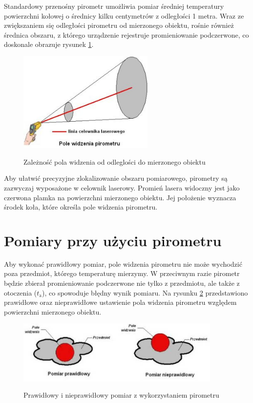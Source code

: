 Standardowy przenośny pirometr umożliwia pomiar średniej temperatury powierzchni kołowej o średnicy kilku centymetrów z odległości 1 metra. Wraz ze zwiększaniem się odległości pirometru od mierzonego obiektu, rośnie również średnica obszaru, z którego urządzenie rejestruje promieniowanie podczerwone, co doskonale obrazuje rysunek \ref{fig:pole}.

\begin{figure}[h!]
    \centering
    \includegraphics[width=0.6\textwidth]{images/pole.jpg}
    \caption{Zależność pola widzenia od odleglości do mierzonego obiektu} \cite{2}
    \label{fig:pole}
\end{figure}

\vspace{12pt}

Aby ułatwić precyzyjne zlokalizowanie obszaru pomiarowego, pirometry są zazwyczaj wyposażone w celownik laserowy. Promień lasera widoczny jest jako czerwona plamka na powierzchni mierzonego obiektu. Jej położenie wyznacza środek koła, które określa pole widzenia pirometru.

\section*{Pomiary przy użyciu pirometru}

Aby wykonać prawidłowy pomiar, pole widzenia pirometru nie może wychodzić poza przedmiot, którego temperaturę mierzymy. W przeciwnym razie pirometr będzie zbierał promieniowanie podczerwone nie tylko z przedmiotu, ale także z otoczenia ($t_\text{a}$), co spowoduje błędny wynik pomiaru. Na rysunku \ref{fig:pomiar} przedstawiono prawidłowe oraz nieprawidłowe ustawienie pola widzenia pirometru względem powierzchni mierzonego obiektu.

\begin{figure}[h!]
    \centering
    \includegraphics[width=0.9\textwidth]{images/pomiar.jpg}
    \caption{Prawidłowy i nieprawidłowy pomiar z wykorzystaniem pirometru} \cite{2}
    \label{fig:pomiar}
\end{figure}

